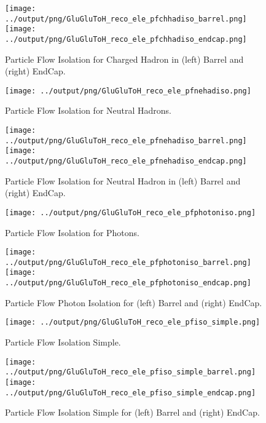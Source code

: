 \documentclass[11pt]{book}
\begin{document}
\begin{figure}[ht]
\centering
\texttt{[image: ../output/png/GluGluToH\_reco\_ele\_pfchhadiso\_barrel.png]}
\texttt{[image: ../output/png/GluGluToH\_reco\_ele\_pfchhadiso\_endcap.png]}
\caption{Particle Flow Isolation for Charged Hadron in (left) Barrel and (right) EndCap.}
\label{fig:gluglu_reco_ele_pfchhadiso_regions}
\end{figure}

\begin{figure}[ht]
\centering
\texttt{[image: ../output/png/GluGluToH\_reco\_ele\_pfnehadiso.png]}
\caption{Particle Flow Isolation for Neutral Hadrons.}
\label{fig:gluglu_reco_ele_pfnehadiso}
\end{figure}

\begin{figure}[ht]
\centering
\texttt{[image: ../output/png/GluGluToH\_reco\_ele\_pfnehadiso\_barrel.png]}
\texttt{[image: ../output/png/GluGluToH\_reco\_ele\_pfnehadiso\_endcap.png]}
\caption{Particle Flow Isolation for Neutral Hadron in (left) Barrel and (right) EndCap.}
\label{fig:gluglu_reco_ele_pfnehadiso_regions}
\end{figure}

\begin{figure}[ht]
\centering
\texttt{[image: ../output/png/GluGluToH\_reco\_ele\_pfphotoniso.png]}
\caption{Particle Flow Isolation for Photons.}
\label{fig:gluglu_reco_ele_pfphotoniso}
\end{figure}

\begin{figure}[ht]
\centering
\texttt{[image: ../output/png/GluGluToH\_reco\_ele\_pfphotoniso\_barrel.png]}
\texttt{[image: ../output/png/GluGluToH\_reco\_ele\_pfphotoniso\_endcap.png]}
\caption{Particle Flow Photon Isolation for (left) Barrel and (right) EndCap.}
\label{fig:gluglu_reco_ele_pfphotoniso_regions}
\end{figure}

\begin{figure}[ht]
\centering
\texttt{[image: ../output/png/GluGluToH\_reco\_ele\_pfiso\_simple.png]}
\caption{Particle Flow Isolation Simple.}
\label{fig:gluglu_reco_ele_pfiso_simple}
\end{figure}

\begin{figure}[ht]
\centering
\texttt{[image: ../output/png/GluGluToH\_reco\_ele\_pfiso\_simple\_barrel.png]}
\texttt{[image: ../output/png/GluGluToH\_reco\_ele\_pfiso\_simple\_endcap.png]}
\caption{Particle Flow Isolation Simple for (left) Barrel and (right) EndCap.}
\label{fig:gluglu_reco_ele_pfiso_simple_regions}
\end{figure}
\end{document}
